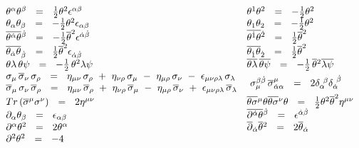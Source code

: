 \documentclass[14pt]{article}
\newcommand{\p}{\partial}
\newcommand{\ov}{\overline}
\begin{document}
\begin{eqnarray*}
\begin{array}{ll}
  \theta^\alpha \theta^\beta ~~=~~ 
	\frac{1}{2}\theta^2 \epsilon^{\alpha\beta} 
  & \theta^1 \theta^2 ~~=~~ - \frac{1}{2} \theta^2 \\
   \theta_\alpha \theta_\beta ~~=~~ 
	-\frac{1}{2}\theta^2 \epsilon_{\alpha\beta} 
  & \theta_1 \theta_2 ~~=~~ 
	-\frac{1}{2}\theta^2 \\
   \overline{\theta^{\dot{\alpha}}\theta}{}^{\dot{\beta}} ~~=~~ 
	-\frac{1}{2}\overline{\theta}^2 \epsilon^{\dot{\alpha}\dot{\beta}}
  & \overline{\theta^{\dot{1}}\theta}{}^{\dot{2}} ~~=~~ 
	\frac{1}{2}\overline{\theta}^2 \\
   \overline{\theta_{\dot{\alpha}}\theta}{}_{\dot{\beta}} ~~=~~
	\frac{1}{2}\overline{\theta}^2 \epsilon_{\dot{\alpha}\dot{\beta}}
  & \overline{\theta_{\dot{1}}\theta}{}_{\dot{2}} ~~=~~
	\frac{1}{2}\overline{\theta}^2 \\
   \theta\lambda\, \theta\psi ~~=~~ - \frac{1}{2}\, \theta^2 \lambda\psi 
  &
   \ov{\theta\lambda}\, \ov{\theta\psi} ~~=~~ -\frac{1}{2}\, \ov{\theta}{}^2 \ov{\lambda\psi} \\
   \sigma_\mu\,\ov{\sigma}{}_\nu\, \sigma_\rho ~~=~~ 
	\eta_{\mu\nu}\, \sigma_\rho ~+~ \eta_{\nu\rho}\,\sigma_\mu ~-~ \eta_{\mu\rho}\,\sigma_\nu
	~-~ \epsilon_{\mu\nu\rho\lambda}\,\sigma_\lambda 
&
   \multirow{2}{*}{
$	\sigma_\mu^{\beta\dot\beta}\, \ov{\sigma}{}_{\dot\alpha\alpha}^\mu ~~=~~
				2 \delta_\alpha^{\ \beta} \delta_{\dot\alpha}^{\ \dot\beta}  $
	} \\
   \ov{\sigma}{}_\mu\,\sigma_\nu\,\ov{\sigma}{}_\rho ~~=~~
	\eta_{\mu\nu}\, \ov{\sigma}{}_\rho ~+~ \eta_{\nu\rho}\, \ov{\sigma}{}_\mu 
								   ~-~ \eta_{\mu\rho}\, \ov{\sigma}{}_\nu
	~+~ \epsilon_{\mu\nu\rho\lambda}\,\ov{\sigma}{}_\lambda \\
   Tr \left ( \overline{\sigma}^\mu\sigma^\nu \right) ~~=~~
	2 \eta^{\mu\nu}
  & \overline{\theta\sigma}{}^\mu\theta 
    \overline{\theta\sigma}{}^\nu\theta ~~=~~
	\frac{1}{2} \theta^2\overline{\theta}^2 \eta^{\mu\nu} \\
   \p_\alpha \theta_\beta ~~=~~ \epsilon_{\alpha\beta} 
  &
   \ov{\p^{\dot\alpha} \theta}{}^{\dot\beta} ~~=~~ \epsilon^{\dot\alpha\dot\beta} \\
   \partial^\alpha \theta^2 ~~=~~ 2 \theta^\alpha
  & \overline{\partial}_{\dot{\alpha}} \overline{\theta}{}^2 ~~=~~
	2 \overline{\theta}_{\dot{\alpha}} \\
   \partial^2 \theta^2 ~~=~~ -4

\end{array}
\end{eqnarray*}
\end{document}
